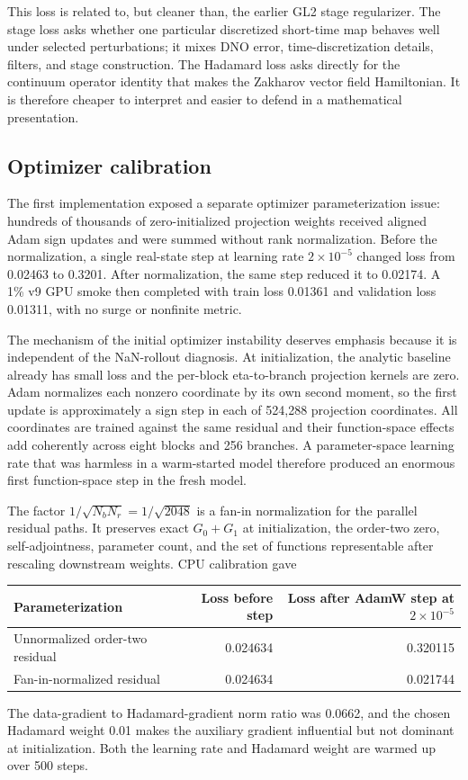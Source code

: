 \documentclass[11pt]{article}
\begin{document}
This loss is related to, but cleaner than, the earlier GL2 stage regularizer.
The stage loss asks whether one particular discretized short-time map behaves
well under selected perturbations; it mixes DNO error, time-discretization
details, filters, and stage construction.  The Hadamard loss asks directly for
the continuum operator identity that makes the Zakharov vector field
Hamiltonian.  It is therefore cheaper to interpret and easier to defend in a
mathematical presentation.

\subsection{Optimizer calibration}

The first implementation exposed a separate optimizer parameterization issue:
hundreds of thousands of zero-initialized projection weights received aligned
Adam sign updates and were summed without rank normalization.  Before the
normalization, a single real-state step at learning rate \(2\times10^{-5}\)
changed loss from 0.02463 to 0.3201.  After normalization, the same step reduced
it to 0.02174.  A 1\% v9 GPU smoke then completed with train loss 0.01361 and
validation loss 0.01311, with no surge or nonfinite metric.

The mechanism of the initial optimizer instability deserves emphasis because
it is independent of the NaN-rollout diagnosis.  At initialization, the
analytic baseline already has small loss and the per-block eta-to-branch
projection kernels are zero.  Adam normalizes each nonzero coordinate by its
own second moment, so the first update is approximately a sign step in each of
524,288 projection coordinates.  All coordinates are trained against the same
residual and their function-space effects add coherently across eight blocks
and 256 branches.  A parameter-space learning rate that was harmless in a
warm-started model therefore produced an enormous first function-space step in
the fresh model.

The factor \(1/\sqrt{N_bN_r}=1/\sqrt{2048}\) is a fan-in normalization for the
parallel residual paths.  It preserves exact \(G_0+G_1\) at initialization,
the order-two zero, self-adjointness, parameter count, and the set of functions
representable after rescaling downstream weights.  CPU calibration gave
\begin{center}
\begin{tabular}{lrr}
\toprule
Parameterization & Loss before step & Loss after AdamW step at $2\times10^{-5}$ \\
\midrule
Unnormalized order-two residual & 0.024634 & 0.320115 \\
Fan-in-normalized residual & 0.024634 & 0.021744 \\
\bottomrule
\end{tabular}
\end{center}
The data-gradient to Hadamard-gradient norm ratio was 0.0662, and the chosen
Hadamard weight 0.01 makes the auxiliary gradient influential but not dominant
at initialization.  Both the learning rate and Hadamard weight are warmed up
over 500 steps.
\end{document}
